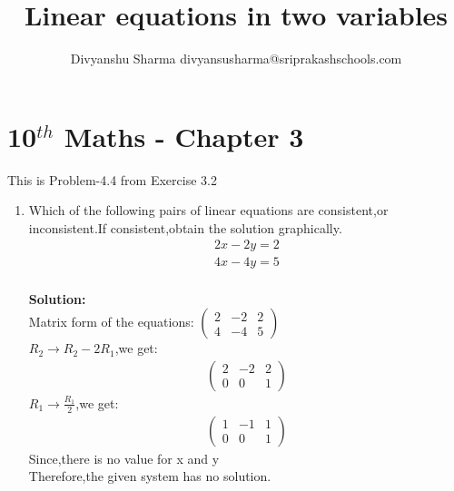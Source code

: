 \documentclass[12pt]{article}
\title{Linear equations in two variables}
\author{Divyanshu Sharma {divyansusharma@sriprakashschools.com}}
\newcommand{\myvec}[1]{\ensuremath{\begin{pmatrix}#1\end{pmatrix}}}
\newcommand{\solution}{\noindent \textbf{Solution: }}
\begin{document}
\maketitle
\section*{10$^{th}$ Maths - Chapter 3}
This is Problem-4.4 from Exercise 3.2
\begin{enumerate}
\item Which of the following pairs of linear equations are consistent,or inconsistent.If consistent,obtain the solution graphically.\\
\begin{align}
2x-2y=2\\
4x-4y=5\\
\end{align}

\solution \\
Matrix form of the equations:
$\myvec{2 & -2 & 2\\4 & -4 & 5}$\\

$R_2\rightarrow R_2 - 2R_1$,we get:
\begin{align}
\myvec{2 & -2 & 2\\0 & 0 & 1}
\end{align}
$R_1\rightarrow \frac{R_1}{2}$,we get:
\begin{align}
\myvec{1 & -1 & 1\\0 & 0 & 1}
\end{align}
Since,there is no value for x and y
\\Therefore,the given system has no solution.
\end{enumerate}
\end{document}
